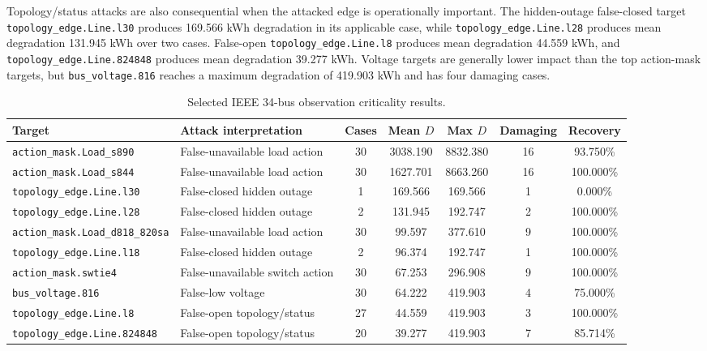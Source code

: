 Topology/status attacks are also consequential when the attacked edge is operationally important. The hidden-outage false-closed target \texttt{topology\_edge.Line.l30} produces 169.566 kWh degradation in its applicable case, while \texttt{topology\_edge.Line.l28} produces mean degradation 131.945 kWh over two cases. False-open \texttt{topology\_edge.Line.l8} produces mean degradation 44.559 kWh, and \texttt{topology\_edge.Line.824848} produces mean degradation 39.277 kWh. Voltage targets are generally lower impact than the top action-mask targets, but \texttt{bus\_voltage.816} reaches a maximum degradation of 419.903 kWh and has four damaging cases.

\begin{table}[t]
\centering
\caption{Selected IEEE 34-bus observation criticality results.}
\label{tab:ieee34_observation_criticality}
\scriptsize
\begin{tabular}{llccccc}
\hline
Target & Attack interpretation & Cases & Mean $D$ & Max $D$ & Damaging & Recovery \\
\hline
\texttt{action\_mask.Load\_s890} & False-unavailable load action & 30 & 3038.190 & 8832.380 & 16 & 93.750\% \\
\texttt{action\_mask.Load\_s844} & False-unavailable load action & 30 & 1627.701 & 8663.260 & 16 & 100.000\% \\
\texttt{topology\_edge.Line.l30} & False-closed hidden outage & 1 & 169.566 & 169.566 & 1 & 0.000\% \\
\texttt{topology\_edge.Line.l28} & False-closed hidden outage & 2 & 131.945 & 192.747 & 2 & 100.000\% \\
\texttt{action\_mask.Load\_d818\_820sa} & False-unavailable load action & 30 & 99.597 & 377.610 & 9 & 100.000\% \\
\texttt{topology\_edge.Line.l18} & False-closed hidden outage & 2 & 96.374 & 192.747 & 1 & 100.000\% \\
\texttt{action\_mask.swtie4} & False-unavailable switch action & 30 & 67.253 & 296.908 & 9 & 100.000\% \\
\texttt{bus\_voltage.816} & False-low voltage & 30 & 64.222 & 419.903 & 4 & 75.000\% \\
\texttt{topology\_edge.Line.l8} & False-open topology/status & 27 & 44.559 & 419.903 & 3 & 100.000\% \\
\texttt{topology\_edge.Line.824848} & False-open topology/status & 20 & 39.277 & 419.903 & 7 & 85.714\% \\
\hline
\end{tabular}
\end{table}

